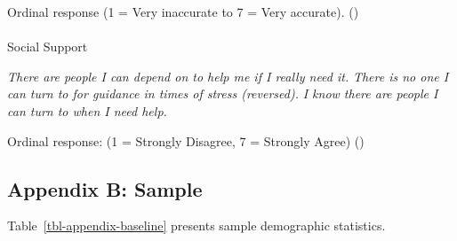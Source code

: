 \documentclass[
  single column]{article}
\makeatletter
\let\oldparagraph\paragraph
\renewcommand{\paragraph}{
    \@ifstar
      \xxxParagraphStar
      \xxxParagraphNoStar
  }
\newcommand{\xxxParagraphStar}[1]{\oldparagraph*{#1}\mbox{}}
\newcommand{\xxxParagraphNoStar}[1]{\oldparagraph{#1}\mbox{}}
\makeatother
\begin{document}
Ordinal response (1 = Very inaccurate to 7 = Very accurate).
()

\paragraph{Social Support}\label{social-support}

\emph{There are people I can depend on to help me if I really need it.}
\emph{There is no one I can turn to for guidance in times of stress
(reversed).} \emph{I know there are people I can turn to when I need
help.}

Ordinal response: (1 = Strongly Disagree, 7 = Strongly Agree)
()

\subsection{Appendix B: Sample}\label{appendix-sample}

Table~\ref{tbl-appendix-baseline} presents sample demographic
statistics.
\end{document}

